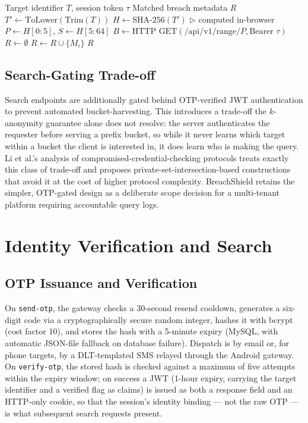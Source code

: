 \documentclass[conference]{IEEEtran}
\begin{document}
\begin{algorithm}[htbp]
\caption{Client-Side $k$-Anonymity Range Query}
\label{alg:range}
\begin{algorithmic}[1]
\REQUIRE Target identifier $T$, session token $\tau$
\ENSURE Matched breach metadata $R$
\STATE $T' \gets \text{ToLower}(\text{Trim}(T))$
\STATE $H \gets \text{SHA-256}(T')$ \hfill $\triangleright$ computed in-browser
\STATE $P \gets H[0:5]$, $S \gets H[5:64]$
\STATE $B \gets \text{HTTP GET}(\text{/api/v1/range/}P, \text{Bearer } \tau)$
\STATE $R \gets \emptyset$
        \STATE $R \gets R \cup \{M_i\}$
    \ENDIF
\ENDFOR
\RETURN $R$
\end{algorithmic}
\end{algorithm}

\subsection{Search-Gating Trade-off}
Search endpoints are additionally gated behind OTP-verified JWT authentication to prevent automated bucket-harvesting. This introduces a trade-off the $k$-anonymity guarantee alone does not resolve: the server authenticates the requester before serving a prefix bucket, so while it never learns which target within a bucket the client is interested in, it does learn who is making the query. Li et al.'s analysis of compromised-credential-checking protocols \cite{li2019protocols} treats exactly this class of trade-off and proposes private-set-intersection-based constructions that avoid it at the cost of higher protocol complexity. BreachShield retains the simpler, OTP-gated design as a deliberate scope decision for a multi-tenant platform requiring accountable query logs.

\section{Identity Verification and Search}
\label{sec:search}

\subsection{OTP Issuance and Verification}
On \texttt{send-otp}, the gateway checks a 30-second resend cooldown, generates a six-digit code via a cryptographically secure random integer, hashes it with bcrypt (cost factor 10), and stores the hash with a 5-minute expiry (MySQL, with automatic JSON-file fallback on database failure). Dispatch is by email or, for phone targets, by a DLT-templated SMS relayed through the Android gateway. On \texttt{verify-otp}, the stored hash is checked against a maximum of five attempts within the expiry window; on success a JWT \cite{rfc7519jwt} (1-hour expiry, carrying the target identifier and a verified flag as claims) is issued as both a response field and an HTTP-only cookie, so that the session's identity binding --- not the raw OTP --- is what subsequent search requests present.
\end{document}
